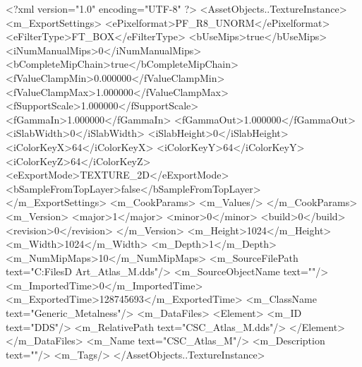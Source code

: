 <?xml version="1.0" encoding="UTF-8" ?>
<AssetObjects..TextureInstance>
	<m_ExportSettings>
		<ePixelformat>PF_R8_UNORM</ePixelformat>
		<eFilterType>FT_BOX</eFilterType>
		<bUseMips>true</bUseMips>
		<iNumManualMips>0</iNumManualMips>
		<bCompleteMipChain>true</bCompleteMipChain>
		<fValueClampMin>0.000000</fValueClampMin>
		<fValueClampMax>1.000000</fValueClampMax>
		<fSupportScale>1.000000</fSupportScale>
		<fGammaIn>1.000000</fGammaIn>
		<fGammaOut>1.000000</fGammaOut>
		<iSlabWidth>0</iSlabWidth>
		<iSlabHeight>0</iSlabHeight>
		<iColorKeyX>64</iColorKeyX>
		<iColorKeyY>64</iColorKeyY>
		<iColorKeyZ>64</iColorKeyZ>
		<eExportMode>TEXTURE_2D</eExportMode>
		<bSampleFromTopLayer>false</bSampleFromTopLayer>
	</m_ExportSettings>
	<m_CookParams>
		<m_Values/>
	</m_CookParams>
	<m_Version>
		<major>1</major>
		<minor>0</minor>
		<build>0</build>
		<revision>0</revision>
	</m_Version>
	<m_Height>1024</m_Height>
	<m_Width>1024</m_Width>
	<m_Depth>1</m_Depth>
	<m_NumMipMaps>10</m_NumMipMaps>
	<m_SourceFilePath text="C:\Users\Shadow\Desktop\Working Files\3D Art\Textures\CSC_Atlas_M.dds"/>
	<m_SourceObjectName text=""/>
	<m_ImportedTime>0</m_ImportedTime>
	<m_ExportedTime>128745693</m_ExportedTime>
	<m_ClassName text="Generic_Metalness"/>
	<m_DataFiles>
		<Element>
			<m_ID text="DDS"/>
			<m_RelativePath text="CSC_Atlas_M.dds"/>
		</Element>
	</m_DataFiles>
	<m_Name text="CSC_Atlas_M"/>
	<m_Description text=""/>
	<m_Tags/>
</AssetObjects..TextureInstance>

